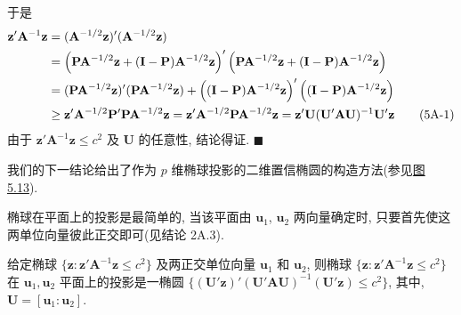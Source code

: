 于是
\label{eq:5A-1}
\begin{align}
\mathbf{z}'\mathbf{A}^{-1}\mathbf{z}&=(\mathbf{A}^{-1/2}\mathbf{z})'(\mathbf{A}^{-1/2}\mathbf{z})\notag\\
&=\left(\mathbf{P}\mathbf{A}^{-1/2}\mathbf{z}+(\mathbf{I}-\mathbf{P})\mathbf{A}^{-1/2}\mathbf{z}\right)'\left(\mathbf{P}\mathbf{A}^{-1/2}\mathbf{z}+(\mathbf{I}-\mathbf{P})\mathbf{A}^{-1/2}\mathbf{z}\right)\notag\\
&=(\mathbf{P}\mathbf{A}^{-1/2}\mathbf{z})'(\mathbf{P}\mathbf{A}^{-1/2}\mathbf{z})+\left((\mathbf{I}-\mathbf{P})\mathbf{A}^{-1/2}\mathbf{z}\right)'\left((\mathbf{I}-\mathbf{P})\mathbf{A}^{-1/2}\mathbf{z}\right)\notag\\
&\ge\mathbf{z}'\mathbf{A}^{-1/2}\mathbf{P}'\mathbf{P}\mathbf{A}^{-1/2}\mathbf{z}
=\mathbf{z}'\mathbf{A}^{-1/2}\mathbf{P}\mathbf{A}^{-1/2}\mathbf{z}
=\mathbf{z}'\mathbf{U}(\mathbf{U}'\mathbf{A}\mathbf{U})^{-1}\mathbf{U}'\mathbf{z} \tag{5A-1}
\end{align}
由于 $\mathbf{z}'\mathbf{A}^{-1}\mathbf{z}\le c^2$ 及 $\mathbf{U}$ 的任意性, 结论得证. \hfill$\blacksquare$

我们的下一结论给出了作为 $p$ 维椭球投影的二维置信椭圆的构造方法(参见\hyperref[fig:5.13]{图 5.13}).

\begin{mvfigure}
\label{fig:5.13}
\end{mvfigure}

椭球在平面上的投影是最简单的, 当该平面由 $\mathbf{u}_1$, $\mathbf{u}_2$ 两向量确定时, 只要首先使这两单位向量彼此正交即可(见结论 2A.3).

 给定椭球 $\{\mathbf{z}:\mathbf{z}'\mathbf{A}^{-1}\mathbf{z}\le c^2\}$ 及两正交单位向量 $\mathbf{u}_1$ 和 $\mathbf{u}_2$, 则椭球 $\{\mathbf{z}:\mathbf{z}'\mathbf{A}^{-1}\mathbf{z}\le c^2\}$ 在 $\mathbf{u}_1,\mathbf{u}_2$ 平面上的投影是一椭圆 $\{(\mathbf{U}'\mathbf{z})'(\mathbf{U}'\mathbf{A}\mathbf{U})^{-1}(\mathbf{U}'\mathbf{z})\le c^2\}$, 其中, $\mathbf{U}=[\mathbf{u}_1:\mathbf{u}_2]$.

